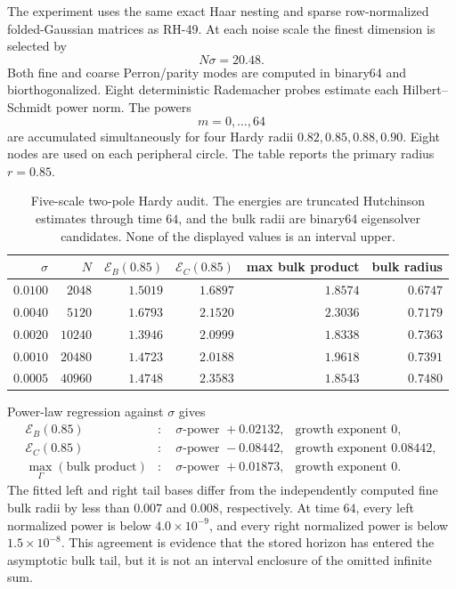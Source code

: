 \documentclass[11pt]{article}
\theoremstyle{definition}
\theoremstyle{remark}
\newcommand{\cE}{\mathcal E}
\begin{document}
The experiment uses the same exact Haar nesting and sparse
row-normalized folded-Gaussian matrices as RH-49.  At each noise scale the
finest dimension is selected by
\begin{equation}
 N\sigma=20.48.
 \label{eq:resolution}
\end{equation}
Both fine and coarse Perron/parity modes are computed in binary64 and
biorthogonalized.  Eight deterministic Rademacher probes estimate each
Hilbert--Schmidt power norm.  The powers
\[
 m=0,\ldots,64
\]
are accumulated simultaneously for four Hardy radii
\(0.82,0.85,0.88,0.90\).  Eight nodes are used on each peripheral circle.
The table reports the primary radius \(r=0.85\).

\begin{table}[H]
\centering
\small
\begin{tabular}{@{}rrrrrr@{}}
\toprule
\(\sigma\) & \(N\) & \(\cE_B(0.85)\) &
\(\cE_C(0.85)\) & max bulk product & bulk radius\\
\midrule
\(0.0100\) & \(2048\)  & \(1.5019\) & \(1.6897\) & \(1.8574\) & \(0.6747\)\\
\(0.0040\) & \(5120\)  & \(1.6793\) & \(2.1520\) & \(2.3036\) & \(0.7179\)\\
\(0.0020\) & \(10240\) & \(1.3946\) & \(2.0999\) & \(1.8338\) & \(0.7363\)\\
\(0.0010\) & \(20480\) & \(1.4723\) & \(2.0188\) & \(1.9618\) & \(0.7391\)\\
\(0.0005\) & \(40960\) & \(1.4748\) & \(2.3583\) & \(1.8543\) & \(0.7480\)\\
\bottomrule
\end{tabular}
\caption{Five-scale two-pole Hardy audit.  The energies are truncated
Hutchinson estimates through time \(64\), and the bulk radii are binary64
eigensolver candidates.  None of the displayed values is an interval
upper.}
\label{tab:hardy}
\end{table}

Power-law regression against \(\sigma\) gives
\begin{align}
 \cE_B(0.85)&:\quad
 \text{\(\sigma\)-power }+0.02132,
 &
 \text{growth exponent }0,
 \label{eq:left-fit}\\
 \cE_C(0.85)&:\quad
 \text{\(\sigma\)-power }-0.08442,
 &
 \text{growth exponent }0.08442,
 \label{eq:right-fit}\\
 \max_\Gamma(\text{bulk product})&:\quad
 \text{\(\sigma\)-power }+0.01873,
 &
 \text{growth exponent }0.
 \label{eq:product-fit}
\end{align}
The fitted left and right tail bases differ from the independently computed
fine bulk radii by less than \(0.007\) and \(0.008\), respectively.  At
time \(64\), every left normalized power is below
\(4.0\times10^{-9}\), and every right normalized power is below
\(1.5\times10^{-8}\).  This agreement is evidence that the stored horizon
has entered the asymptotic bulk tail, but it is not an interval enclosure of
the omitted infinite sum.
\end{document}
